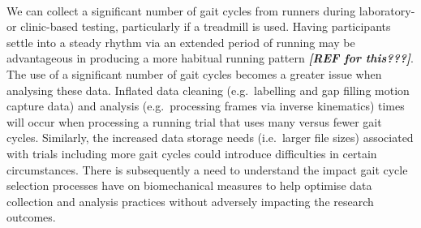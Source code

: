 \documentclass[]{elsarticle} %
\begin{document}
~

We can collect a significant number of gait cycles from runners during
laboratory- or clinic-based testing, particularly if a treadmill is
used. Having participants settle into a steady rhythm via an extended
period of running may be advantageous in producing a more habitual
running pattern \textbf{\emph{{[}REF for this???{]}}}. The use of a
significant number of gait cycles becomes a greater issue when analysing
these data. Inflated data cleaning (e.g.~labelling and gap filling
motion capture data) and analysis (e.g.~processing frames via inverse
kinematics) times will occur when processing a running trial that uses
many versus fewer gait cycles. Similarly, the increased data storage
needs (i.e.~larger file sizes) associated with trials including more
gait cycles could introduce difficulties in certain circumstances. There
is subsequently a need to understand the impact gait cycle selection
processes have on biomechanical measures to help optimise data
collection and analysis practices without adversely impacting the
research outcomes.

~
\end{document}
